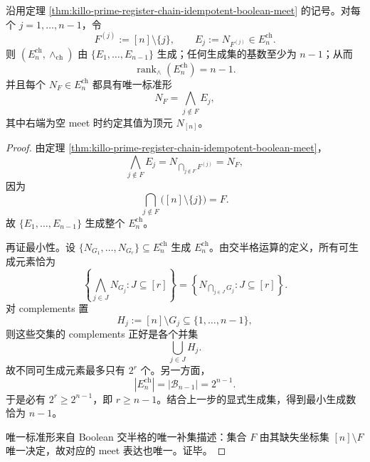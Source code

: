 \begin{theorem}\label{thm:killo-prime-register-chain-idempotent-boolean-rank}
沿用定理 \ref{thm:killo-prime-register-chain-idempotent-boolean-meet} 的记号。对每个 \(j=1,\dots,n-1\)，令
\[
F^{(j)}:=[n]\setminus\{j\},
\qquad
E_j:=N_{F^{(j)}}\in E_n^{\mathrm{ch}}.
\]
则 \((E_n^{\mathrm{ch}},\wedge_{\mathrm{ch}})\) 由 \(\{E_1,\dots,E_{n-1}\}\) 生成；任何生成集的基数至少为 \(n-1\)；从而
\[
\operatorname{rank}_{\wedge}(E_n^{\mathrm{ch}})=n-1.
\]
并且每个 \(N_F\in E_n^{\mathrm{ch}}\) 都具有唯一标准形
\[
N_F=\bigwedge_{j\notin F}E_j,
\]
其中右端为空 meet 时约定其值为顶元 \(N_{[n]}\)。
\end{theorem}
\begin{proof}
由定理 \ref{thm:killo-prime-register-chain-idempotent-boolean-meet}，
\[
\bigwedge_{j\notin F}E_j
=
N_{\bigcap_{j\notin F}F^{(j)}}
=
N_F,
\]
因为
\[
\bigcap_{j\notin F}\bigl([n]\setminus\{j\}\bigr)=F.
\]
故 \(\{E_1,\dots,E_{n-1}\}\) 生成整个 \(E_n^{\mathrm{ch}}\)。

再证最小性。设 \(\{N_{G_1},\dots,N_{G_r}\}\subseteq E_n^{\mathrm{ch}}\) 生成 \(E_n^{\mathrm{ch}}\)。由交半格运算的定义，所有可生成元素恰为
\[
\left\{
\bigwedge_{j\in J}N_{G_j}:J\subseteq [r]
\right\}
=
\left\{
N_{\bigcap_{j\in J}G_j}:J\subseteq [r]
\right\}.
\]
对 complements 置
\[
H_j:=[n]\setminus G_j\subseteq\{1,\dots,n-1\},
\]
则这些交集的 complements 正好是各个并集
\[
\bigcup_{j\in J}H_j.
\]
故不同可生成元素最多只有 \(2^r\) 个。另一方面，
\[
|E_n^{\mathrm{ch}}|
=
|\mathcal B_{n-1}|
=
2^{n-1}.
\]
于是必有 \(2^r\ge 2^{n-1}\)，即 \(r\ge n-1\)。结合上一步的显式生成集，得到最小生成数恰为 \(n-1\)。

唯一标准形来自 Boolean 交半格的唯一补集描述：集合 \(F\) 由其缺失坐标集 \([n]\setminus F\) 唯一决定，故对应的 meet 表达也唯一。证毕。
\end{proof}

